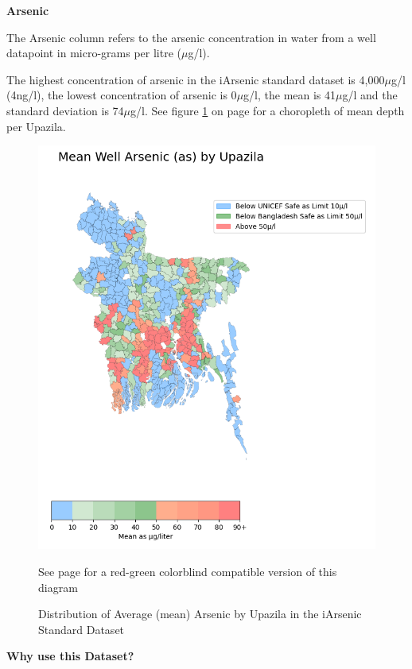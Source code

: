 \textbf{Arsenic}

The Arsenic column refers to the arsenic concentration in water from a well datapoint in micro-grams per litre ($\mu$g/l).

The highest concentration of arsenic in the iArsenic standard dataset is 4,000$\mu$g/l (4ng/l), the lowest concentration of arsenic is 0$\mu$g/l, the mean is 41$\mu$g/l and the standard deviation is 74$\mu$g/l. See figure \ref{fig:x avg_as} on page \pageref{fig:x avg_as} for a choropleth of mean depth per Upazila.

\begin{figure}[!htb]
    \centering
    \includegraphics[scale=0.6]{figures/mean_as_by_upazila.png} 
    \caption{Distribution of Average (mean) Arsenic by Upazila in the iArsenic Standard Dataset}
    \small{See page \pageref{fig:x avg_as_cblind} for a red-green colorblind compatible version of this diagram}
    \label{fig:x avg_as}
\end{figure}

\newpage

\textbf{Why use this Dataset?}

